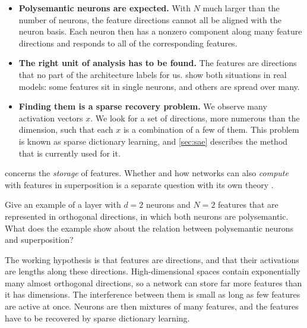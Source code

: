 \begin{itemize}
\item \textbf{Polysemantic neurons are expected.} With $N$ much larger than the number of neurons, the feature
directions cannot all be aligned with the neuron basis. Each neuron then has a nonzero component along many
feature directions and responds to all of the corresponding features.
\item \textbf{The right unit of analysis has to be found.} The features are directions that no part of the
architecture labels for us. \citet{gurnee2023finding} show both situations in real models: some features sit in
single neurons, and others are spread over many.
\item \textbf{Finding them is a sparse recovery problem.} We observe many activation vectors $x$. We look for a
set of directions, more numerous than the dimension, such that each $x$ is a combination of a few of them. This
problem is known as sparse dictionary learning, and \cref{sec:sae} describes the method that is currently used
for it.
\end{itemize}

 concerns the \emph{storage} of features. Whether and how networks can also
\emph{compute} with features in superposition is a separate question with its own theory
\citep{hanni2024mathematical,adler2024complexity}.

\begin{exercise}\label{ex:polysem}
Give an example of a layer with $d=2$ neurons and $N=2$ features that are represented in orthogonal directions,
in which both neurons are polysemantic. What does the example show about the relation between polysemantic
neurons and superposition?
\end{exercise}

\begin{takeaways}
The working hypothesis is that features are directions, and that their activations are lengths along these
directions. High-dimensional spaces contain exponentially many almost orthogonal directions, so a network can
store far more features than it has dimensions. The interference between them is small as long as few features
are active at once. Neurons are then mixtures of many features, and the features have to be recovered by sparse
dictionary learning.
\end{takeaways}

